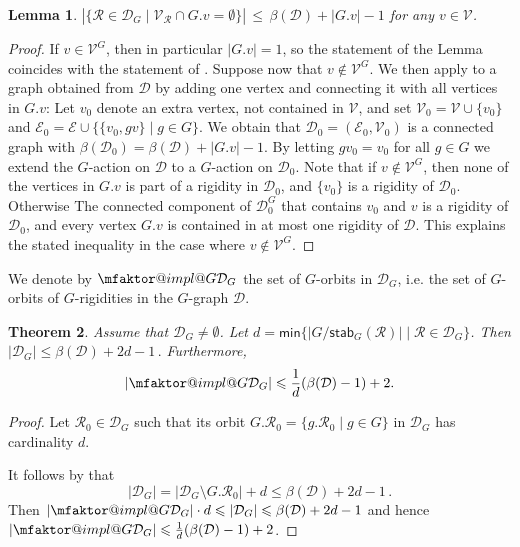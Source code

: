 \documentclass[a4paper,12pt,reqno]{amsart}
\makeatletter
\newcommand\mc\mathcal
\newtheorem{thm}{Theorem}[section]
\newtheorem{lem}[thm]{Lemma}
\theoremstyle{definition}
\numberwithin{equation}{thm}
\renewcommand{\min}{\mathsf{min}}
\renewcommand{\leq}{\leqslant}
\DeclareRobustCommand*{\mfaktor}[3][]
{
   { \mathpalette{\mfaktor@impl@}{{#1}{#2}{#3}} }
}
\newcommand*{\mfaktor@impl@}[2]{\mfaktor@impl#1#2}
\newcommand*{\mfaktor@impl}[4]{
   \settoheight{\faktor@zaehlerhoehe}{\ensuremath{#1#2{#3}}}%
   \settoheight{\faktor@nennerhoehe}{\ensuremath{#1#2{#4}}}%
      \raisebox{-0.5\faktor@zaehlerhoehe}{\ensuremath{#1#2{#3}}}%
      \mkern-4mu\diagdown\mkern-5mu%
      \raisebox{0.5\faktor@nennerhoehe}{\ensuremath{#1#2{#4}}}%
}
\makeatother
\begin{document}
\begin{lem}\label{L:pivot-betti-bound}
$|\{\mc{R} \in \mc{D}_G \mid \mc{V}_\mc{R} \cap  G.v = \emptyset\}| \,\leq \, \beta(\mc{D})+|G.v|-1$ for any $v \in \mc{V}$.
\end{lem}
\begin{proof}
If $v \in \mc{V}^G$, then in particular $\vert G.v\vert =1$, so the statement of the Lemma coincides with the statement of . Suppose now that $v \notin \mc{V}^G$.
We then apply  to a graph obtained from $\mc{D}$ by adding one vertex and connecting it with all vertices in $G.v$:
Let $v_0$ denote an extra vertex, not contained in $\mc{V}$, and set $\mc{V}_0={\mc V}\cup\{v_0\}$ and 
$\mc{E}_0=\mc{E}\cup\{\{v_0,gv\}\mid g\in G\}$.
We obtain that $\mc{D}_0=(\mc{E}_0,\mc{V}_0)$ is a connected graph with $\beta(\mc{D}_0)=\beta(\mc{D})+|G.v|-1$.
By letting $gv_0=v_0$ for all $g\in G$ we extend the $G$-action on $\mc{D}$ to a $G$-action on $\mc{D}_0$.
Note that if $v \notin \mc{V}^G$, then none of the vertices in $G.v$ is part of a rigidity in $\mc{D}_0$, and $\{v_0\}$ is a rigidity of $\mc{D}_0$. Otherwise The connected component of $\mc{D}^G_0$ that contains $v_0$ and $v$ is a rigidity of $\mc{D}_0$, and every vertex $G.v$ is contained in at most one rigidity of $\mc{D}$.
This explains the stated inequality in the case where $v \notin \mc{V}^G$.
\end{proof}

We denote by $\mfaktor{G}{\mc{D}_G}$ the set of $G$-orbits
in $\mc{D}_G$, i.e. the set of $G$-orbits of $G$-rigidities in the $G$-graph $\mc{D}$.

\begin{thm}\label{T:pivot-betti-bound}
Assume that $\mc{D}_G\neq \emptyset$.
 Let $d=\min\{|G/\mathsf{stab}_G(\mc{R})|\mid \mc{R}\in\mc{D}_G\}$.
Then $\vert \mc{D}_G \vert\leq \beta(\mc{D})+2d-1\,.$
Furthermore, $$\left\vert \mfaktor{G}{\mc{D}_G} \right\vert \leq \frac{1}d(\beta(\mc{D})-1)+2.$$
\end{thm}
\begin{proof}
Let $\mc{R}_0 \in \mc{D}_G$ such that its orbit $G.\mathcal{R}_0=\{g.\mc{R}_0 \mid g \in G\}$ in $\mc{D}_G$ has cardinality $d$.

It follows by  that $$|\mc{D}_G|=|\mc{D}_G \setminus G.\mc{R}_0|+d\leq \beta(\mc{D})+2d-1\,.$$
Then $\vert \mfaktor{G}{\mc{D}_G}\vert \cdot d\leq |\mc{D}_G|\leq \beta(\mc{D})+2d-1$ and
hence $\vert \mfaktor{G}{\mc{D}_G}\vert \leq \frac{1}d(\beta(\mc{D})-1)+2$.
\end{proof}
\end{document}
